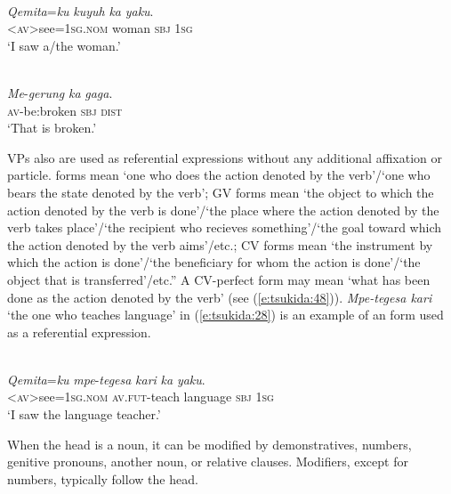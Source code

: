 \documentclass[output=paper
,modfonts
,nonflat]{langsci/langscibook}
\begin{document}
\begin{exe}
	\label{e:tsukida:26}\\
	\gll \textit{Q}{\USSmaller}\textit{em}{\USGreater}\textit{ita}=\textit{ku} \textit{kuyuh}  \textit{ka} \textit{yaku}.\\
	<\textsc{av}>see=\textsc{1sg.nom} woman \textsc{sbj} \textsc{1sg}\\
	\glt ‘I saw a/the woman.’
\end{exe}

\begin{exe}
	\label{e:tsukida:27}\\
	\gll \textit{Me}-\textit{gerung} \textit{ka}  \textit{gaga}.\\
	\textsc{av}-be:broken \textsc{sbj} \textsc{dist}\\
	\glt ‘That is broken.’
\end{exe}

\noindent
VPs also are used as referential expressions without any additional affixation or particle.  forms mean ‘one who does the action denoted by the verb’/‘one who bears the state denoted by the verb’; GV forms mean ‘the object to which the action denoted by the verb is done’/‘the place where the action denoted by the verb takes place’/‘the recipient who recieves something’/‘the goal toward which the action denoted by the verb aims’/etc.; CV forms mean ‘the instrument by which the action is done’/‘the beneficiary for whom the action is done’/‘the object that is transferred’/etc.” A CV-perfect form may mean ‘what has been done as the action denoted by the verb’ (see (\ref{e:tsukida:48})). \textit{Mpe-tegesa kari} ‘the one who teaches language’ in (\ref{e:tsukida:28}) is an example of an  form used as a referential expression.

\begin{exe}
	\label{e:tsukida:28}\\
	\gll \textit{Q}{\USSmaller}\textit{em}{\USGreater}\textit{ita}=\textit{ku}  \textit{mpe}-\textit{tegesa} \textit{kari} \textit{ka}  \textit{yaku}.\\
	<\textsc{av}>see=\textsc{1sg.nom} \textsc{av}.\textsc{fut}-teach language \textsc{sbj} \textsc{1sg}\\
	\glt ‘I saw the language teacher.’
\end{exe}

\noindent
When the head is a noun, it can be modified by demonstratives, numbers, genitive pronouns, another noun, or relative clauses. Modifiers, except for numbers, typically follow the head. 
\end{document}
